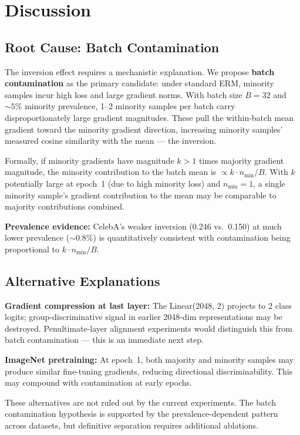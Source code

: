 \section{Discussion}
\label{sec:discussion}

\subsection{Root Cause: Batch Contamination}

The inversion effect requires a mechanistic explanation.
We propose \textbf{batch contamination} as the primary candidate: under standard ERM, minority samples incur high loss and large gradient norms.
With batch size $B=32$ and ${\sim}5\%$ minority prevalence, 1--2 minority samples per batch carry disproportionately large gradient magnitudes.
These pull the within-batch mean gradient toward the minority gradient direction, increasing minority samples' measured cosine similarity with the mean --- the inversion.

Formally, if minority gradients have magnitude $k > 1$ times majority gradient magnitude, the minority contribution to the batch mean is $\propto k \cdot n_\text{min} / B$.
With $k$ potentially large at epoch~1 (due to high minority loss) and $n_\text{min} = 1$, a single minority sample's gradient contribution to the mean may be comparable to majority contributions combined.

\textbf{Prevalence evidence:} CelebA's weaker inversion (0.246 vs.\ 0.150) at much lower prevalence (${\sim}0.8\%$) is quantitatively consistent with contamination being proportional to $k \cdot n_\text{min} / B$.

\subsection{Alternative Explanations}

\textbf{Gradient compression at last layer:} The Linear(2048, 2) projects to 2 class logits; group-discriminative signal in earlier 2048-dim representations may be destroyed.
Penultimate-layer alignment experiments would distinguish this from batch contamination --- this is an immediate next step.

\textbf{ImageNet pretraining:} At epoch~1, both majority and minority samples may produce similar fine-tuning gradients, reducing directional discriminability.
This may compound with contamination at early epochs.

These alternatives are not ruled out by the current experiments.
The batch contamination hypothesis is supported by the prevalence-dependent pattern across datasets, but definitive separation requires additional ablations.


